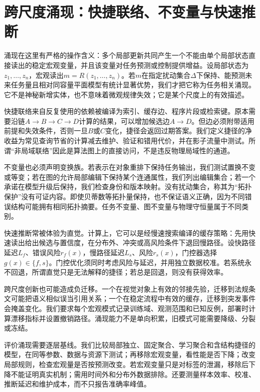 \section{跨尺度涌现：快捷联络、不变量与快速推断}
\label{sec:renormalization_emergence}

涌现在这里有严格的操作含义：多个局部更新共同产生一个不能由单个局部状态直接读出的稳定宏观变量，并且该变量对任务预测或控制提供增益。设局部状态为$z_1,\ldots,z_n$，宏观读出$m=R(z_1,\ldots,z_n)$。若$m$在指定扰动集合$\Delta$下保持、能预测未来任务量且相对同容量平面模型有统计显著优势，我们才把它称为任务相关涌现。它不是神秘新增实体，也不意味着微观规律失效；它是某个尺度上的有效描述。

快捷联络来自反复使用的依赖被编译为索引、缓存边、程序片段或检索键。原本需要沿链$A\to B\to C\to D$计算的结果，可以增加候选边$A\to D$。但边必须附带适用前提和失效条件，否则一旦$B$或$C$变化，捷径会返回过期答案。我们定义捷径的净收益为常见查询节省的计算减去维护、验证和错用代价，并在影子流量中测试。所谓“非局域联络”因此是算法图上的直接访问，不是违反物理局域性的通道。

不变量也必须声明变换族。若表示在对象重排下保持任务输出，我们测试置换不变或等变；若在图的允许局部编辑下保持某个连通属性，我们列出编辑集合；若一个承诺在模型升级后保持，我们检查身份和版本映射。没有扰动集合，称其为“拓扑保护”没有可证内容。即使贝蒂数等拓扑量保持，也不保证语义正确，因为不同错误结构可能拥有相同拓扑摘要。任务不变量、图不变量与物理守恒量属于不同类别。

快速推断常被体验为直觉。计算上，它可以是经慢速搜索编译的缓存策略：先用快速读出给出候选与置信度，在分布外、冲突或高风险条件下退回慢路径。设快路径延迟$L_f$、错误风险$r_f(x)$，慢路径延迟$L_s$、风险$r_s(x)$，门控器选择$g(x)\in\{f,s\}$。门控优化须同时考虑风险与延迟，并用独立数据校准。若系统永不回退，所谓直觉只是无法解释的捷径；若总是回退，则没有获得效率。

跨尺度创新也可能造成负迁移。一个在视觉对象上有效的邻接先验，迁移到法规条文可能把语义相似误当引用关系；一个在稳定流程中有效的缓存，迁移到突发事件会掩盖变化。我们要求每个宏观模式记录训练域、观测范围和已知反例，部署时计算漂移指标并设置撤销路径。涌现能力不是单向积累，旧模式可能需要降级、分裂或冻结。

评价涌现需要逐层基线。我们比较局部独立、固定聚合、学习聚合和含结构捷径的模型，在同等参数、数据与资源下测试；再移除宏观变量，看性能是否下降；改变局部规则，检查宏观量是否按预测改变。若宏观变量只是对标签的泄漏，移除后下降不能证明真实机制；需用时间外和分布外数据排除。还要测量样本效率、校准、推断延迟和维护成本，而不只报告准确率峰值。

